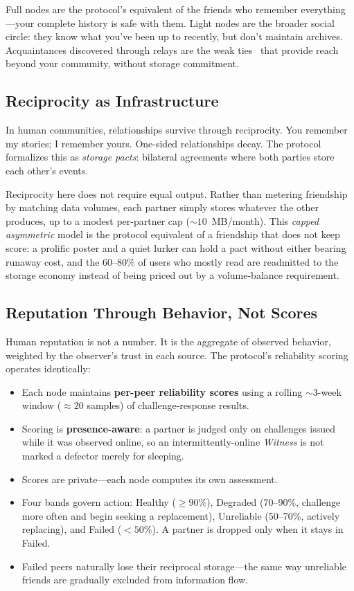 \documentclass[11pt,a4paper]{article}
\begin{document}
Full nodes are the protocol's equivalent of the friends who remember everything---your complete history is safe with them. Light nodes are the broader social circle: they know what you've been up to recently, but don't maintain archives. Acquaintances discovered through relays are the weak ties~\cite{granovetter} that provide reach beyond your community, without storage commitment.

\subsection{Reciprocity as Infrastructure}

In human communities, relationships survive through reciprocity. You remember my stories; I remember yours. One-sided relationships decay. The protocol formalizes this as \emph{storage pacts}: bilateral agreements where both parties store each other's events.

Reciprocity here does not require equal output. Rather than metering friendship by matching data volumes, each partner simply stores whatever the other produces, up to a modest per-partner cap (${\sim}10$~MB/month). This \emph{capped asymmetric} model is the protocol equivalent of a friendship that does not keep score: a prolific poster and a quiet lurker can hold a pact without either bearing runaway cost, and the 60--80\% of users who mostly read are readmitted to the storage economy instead of being priced out by a volume-balance requirement.

\subsection{Reputation Through Behavior, Not Scores}

Human reputation is not a number. It is the aggregate of observed behavior, weighted by the observer's trust in each source. The protocol's reliability scoring operates identically:

\begin{itemize}
  \item Each node maintains \textbf{per-peer reliability scores} using a rolling ${\sim}3$-week window (${\approx}20$ samples) of challenge-response results.
  \item Scoring is \textbf{presence-aware}: a partner is judged only on challenges issued while it was observed online, so an intermittently-online \emph{Witness} is not marked a defector merely for sleeping.
  \item Scores are private---each node computes its own assessment.
  \item Four bands govern action: Healthy ($\geq 90\%$), Degraded (70--90\%, challenge more often and begin seeking a replacement), Unreliable (50--70\%, actively replacing), and Failed ($<50\%$). A partner is dropped only when it stays in Failed.
  \item Failed peers naturally lose their reciprocal storage---the same way unreliable friends are gradually excluded from information flow.
\end{itemize}
\end{document}
